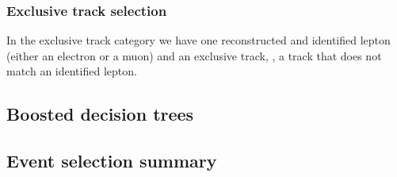 \subsubsection{Exclusive track selection}
\label{sec:exclusive-track-selection}

In the exclusive track category we have one reconstructed and identified lepton (either an electron or a muon) and an exclusive track, \ie, a track that does not match an identified lepton.

\subsection{Boosted decision trees}
\label{sec:event-bdt}

\subsection{Event selection summary}
\label{sec:event-selection-summary}
